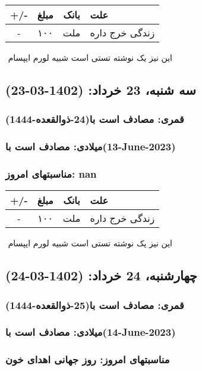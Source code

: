 \documentclass{article}
\newcommand{\rnote}[1]{\marginpar{\textcolor{color}{\StrSubstitute{\##1}{ }{\_}}}}
\newcommand{\myRow}[4]{
    #1 & #2 & #3 & #4 \\ \hline
}
\begin{document}
\begin{tabular}{ | c | c | c | p{5cm} |}
    \hline
    \myRow{ +/- }{مبلغ}{بانک}{علت}
    \myRow{-}{۱۰۰}{ملت}{زندگی خرج داره}
\end{tabular}
\newline
\newline

‌
\rnote{تست}
این نیز یک نوشته تستی است شبیه لورم ایپسام




\newpage
{}
\textcolor{color}{
\section{ سه شنبه، 23 خرداد: (1402-03-23) }
\subsubsection*{قمری: مصادف است با(24-ذوالقعده-1444)} 
\subsubsection*{میلادی: مصادف است با(13-June-2023)}
\subsubsection*{مناسبتهای امروز: nan}
}


\begin{tabular}{ | c | c | c | p{5cm} |}
    \hline
    \myRow{ +/- }{مبلغ}{بانک}{علت}
    \myRow{-}{۱۰۰}{ملت}{زندگی خرج داره}
\end{tabular}
\newline
\newline

‌
\rnote{تست}
این نیز یک نوشته تستی است شبیه لورم ایپسام




\newpage
{}
\textcolor{color}{
\section{ چهارشنبه، 24 خرداد: (1402-03-24) }
\subsubsection*{قمری: مصادف است با(25-ذوالقعده-1444)} 
\subsubsection*{میلادی: مصادف است با(14-June-2023)}
\subsubsection*{مناسبتهای امروز: روز جهانی اهدای خون}
}
\end{document}
